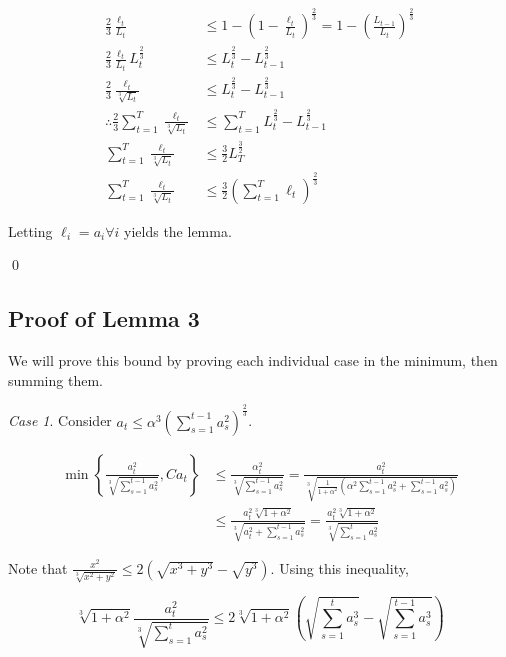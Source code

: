 \documentclass{article}
\begin{document}
\begin{align*}
  \frac{2}{3} \frac{\ell_t}{L_t}
  &\leq 1 - (1 - \frac{\ell_t}{L_t})^\frac{2}{3} = 1 - (\frac{L_{t-1}}{L_t})^\frac{2}{3} \\
  \frac{2}{3} \frac{\ell_t}{L_t} L_{t}^\frac{2}{3} &\leq L_{t}^\frac{2}{3} - L_{t-1}^\frac{2}{3} \\
  \frac{2}{3} \frac{\ell_t}{\sqrt[3]{L_t}} &\leq L_{t}^\frac{2}{3} - L_{t-1}^\frac{2}{3} \\
  \therefore \frac{2}{3} \sum\limits_{t=1}^T \frac{\ell_t}{\sqrt[3]{L_t}} &\leq \sum\limits_{t=1}^T L_{t}^\frac{2}{3} -
  L_{t-1}^\frac{2}{3} \\
  \sum\limits_{t=1}^T \frac{\ell_t}{\sqrt[3]{L_t}} &\leq \frac{3}{2} L_{T}^\frac{3}{2} \\
  \sum\limits_{t=1}^T \frac{\ell_t}{\sqrt[3]{L_t}} &\leq \frac{3}{2} \left(\sum\limits_{t=1}^T \ell_t \right)^\frac{2}{3}
\end{align*}

Letting $\ell_i = a_i \forall i$ yields the lemma.

\qed

\subsection{Proof of Lemma 3}\label{lemmaproof:3}

\secondbound*

\proof We will prove this bound by proving each individual case in the minimum, then summing them.

\emph{Case 1}. Consider $a_t \leq \alpha^3 \left(\sum\limits_{s=1}^{t-1} a_s^2\right)^\frac{2}{3}$.

\begin{align*}
  \min \left\{ \frac{a_{t}^2}{\sqrt[3]{\sum\limits_{s=1}^{t-1} a_{s}^2}}, C a_t \right\} 
  &\leq \frac{\alpha_{t}^2}{\sqrt[3]{\sum\limits_{s=1}^{t-1}a_{s}^2}} =
  \frac{a_{t}^2}{\sqrt[3]{\frac{1}{1+\alpha^2}\left(\alpha^2 \sum\limits_{s=1}^{t-1} a_{s}^2 +
  \sum\limits_{s=1}^{t-1} a_{s}^2 \right)}} \\
  &\leq \frac{a_{t}^2 \sqrt[3]{1 + \alpha^2}}{\sqrt[3]{a_{t}^2 + \sum\limits_{s=1}^{t-1} a_{s}^2}} = \frac{a_{t}^2
  \sqrt[3]{1 + \alpha^2}}{\sqrt[3]{\sum\limits_{s=1}^t a_{s}^2}}
\end{align*}

Note that $\frac{x^2}{\sqrt[3]{x^2 + y^2}} \leq 2(\sqrt{x^3 + y^3} - \sqrt{y^3})$. Using this inequality,

\[
  \sqrt[3]{1 + \alpha^2} \frac{a_{t}^2}{\sqrt[3]{\sum\limits_{s=1}^t a_{s}^2}} \leq 2 \sqrt[3]{1 +
  \alpha^2}\left(\sqrt{\sum\limits_{s=1}^t a_{s}^3} - \sqrt{\sum\limits_{s=1}^{t-1} a_{s}^3}\right)
\]
\end{document}

